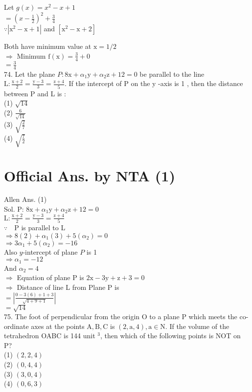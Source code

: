 \documentclass[10pt]{article}
\begin{document}
Let \(g(x)=x^{2}-x+1\)\\
\(=\left(x-\frac{1}{2}\right)^{2}+\frac{3}{4}\)\\
\(\because\left|\mathrm{x}^{2}-\mathrm{x}+1\right|\) and \(\left[\mathrm{x}^{2}-\mathrm{x}+2\right]\)

Both have minimum value at \(\mathrm{x}=1 / 2\)\\
\(\Rightarrow\) Minimum \(\mathrm{f}(\mathrm{x})=\frac{3}{4}+0\)\\
\(=\frac{3}{4}\)\\
74. Let the plane \(P: 8 \mathrm{x}+\alpha_{1} \mathrm{y}+\alpha_{2} \mathrm{z}+12=0\) be parallel to the line \(\mathrm{L}: \frac{\mathrm{x}+2}{2}=\frac{\mathrm{y}-3}{3}=\frac{\mathrm{z}+4}{5}\). If the intercept of P on the y -axis is 1 , then the distance between P and L is :\\
(1) \(\sqrt{14}\)\\
(2) \(\frac{6}{\sqrt{14}}\)\\
(3) \(\sqrt{\frac{2}{7}}\)\\
(4) \(\sqrt{\frac{7}{2}}\)

\section*{Official Ans. by NTA (1)}
Allen Ans. (1)\\
Sol. P: \(8 \mathrm{x}+\alpha_{1} \mathrm{y}+\alpha_{2} \mathrm{z}+12=0\)\\
\(\mathrm{L}: \frac{\mathrm{x}+2}{2}=\frac{\mathrm{y}-3}{3}=\frac{\mathrm{z}+4}{5}\)\\
\(\because \quad \mathrm{P}\) is parallel to L\\
\(\Rightarrow 8(2)+\alpha_{1}(3)+5\left(\alpha_{2}\right)=0\)\\
\(\Rightarrow 3 \alpha_{1}+5\left(\alpha_{2}\right)=-16\)\\
Also \(y\)-intercept of plane \(P\) is 1\\
\(\Rightarrow \alpha_{1}=-12\)\\
And \(\alpha_{2}=4\)\\
\(\Rightarrow\) Equation of plane P is \(2 \mathrm{x}-3 \mathrm{y}+\mathrm{z}+3=0\)\\
\(\Rightarrow\) Distance of line L from Plane P is\\
\(=\left|\frac{0-3(6)+1+3}{\sqrt{4+9+1}}\right|\)\\
\(=\sqrt{14}\)\\
75. The foot of perpendicular from the origin O to a plane P which meets the co-ordinate axes at the points \(\mathrm{A}, \mathrm{B}, \mathrm{C}\) is \((2, \mathrm{a}, 4), \mathrm{a} \in \mathrm{N}\). If the volume of the tetrahedron OABC is 144 unit \(^{3}\), then which of the following points is NOT on P?\\
(1) \((2,2,4)\)\\
(2) \((0,4,4)\)\\
(3) \((3,0,4)\)\\
(4) \((0,6,3)\)
\end{document}
